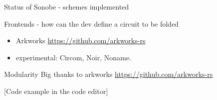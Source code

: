 \documentclass[t]{beamer} \usefonttheme[onlymath]{serif}
\begin{document}
\begin{frame}{Status of Sonobe - schemes implemented}
{  Frontends - how can the dev define a circuit to be folded
  \begin{itemize}
    \item Arkworks \href{https://github.com/arkworks-rs}{https://github.com/arkworks-rs}
    \item experimental: Circom, Noir, Noname.
  \end{itemize}

  }
\end{frame}

\begin{frame}{Modularity}
  Big thanks to arkworks \href{https://github.com/arkworks-rs}{https://github.com/arkworks-rs}

  \vspace{1cm}
  [Code example in the code editor]

\end{frame}
\end{document}
